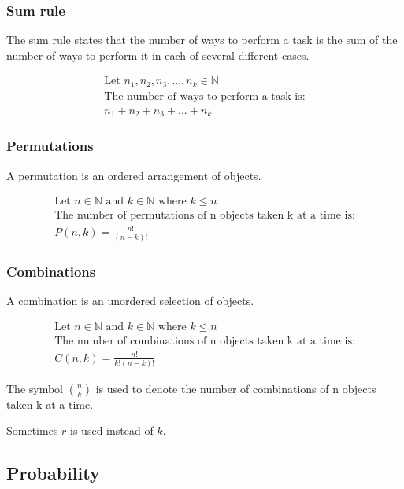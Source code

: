 \documentclass{article}
\begin{document}
\subsubsection{Sum rule}

The sum rule states that the number of ways to perform a task is the sum of the number of ways to perform it in each of several different cases.

\begin{align*}
    \text{Let } n_1, n_2, n_3, ..., n_k \in \mathbb{N} \\
    \text{The number of ways to perform a task is:} \\
    n_1 + n_2 + n_3 + ... + n_k
\end{align*}

\subsubsection{Permutations}

A permutation is an ordered arrangement of objects.

\begin{align*}
    \text{Let } n \in \mathbb{N} \text{ and } k \in \mathbb{N} \text{ where } k \leq n \\
    \text{The number of permutations of n objects taken k at a time is:}                 \\
    P(n, k) = \frac{n!}{(n - k)!}
\end{align*}

\subsubsection{Combinations}

A combination is an unordered selection of objects.

\begin{align*}
    \text{Let } n \in \mathbb{N} \text{ and } k \in \mathbb{N} \text{ where } k \leq n \\
    \text{The number of combinations of n objects taken k at a time is:}                 \\
    C(n, k) = \frac{n!}{k!(n - k)!}
\end{align*}

The symbol $\binom{n}{k}$ is used to denote the number of combinations of n objects taken k at a time.

Sometimes $r$ is used instead of $k$.

\subsection{Probability}
\end{document}
